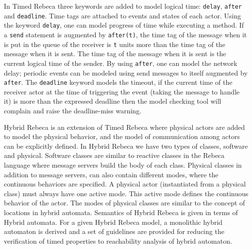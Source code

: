 \documentclass[
graybox,
envcountchap
]{svmult}
\begin{document}
\begin{bibunit}
In Timed Rebeca \cite{DBLP:journals/scp/KhamespanahSSKI15,DBLP:conf/birthday/SirjaniK16} three keywords are added to model logical time: \texttt{delay}, \texttt{after} and \texttt{deadline}. Time tags are attached to events and states of each actor. Using the keyword \texttt{delay}, one can model progress of time while executing a method. If a \texttt{send} statement is augmented by \texttt{after(t)},  the time tag  of the message when it is put in the queue of the receiver is \texttt{t} units more than the time tag of the message when it is sent. The time tag of the message when it is sent is the current logical time of the sender. By using \texttt{after}, one can model the network delay; periodic events can be modeled using send messages to itself augmented by  \texttt{after}.
The \texttt{deadline} keyword models the timeout, if the current time of the receiver actor at the time of triggering the event (taking the message to handle it) is more than the expressed deadline then the model checking tool will complain and raise the deadline-miss warning.

Hybrid Rebeca is an extension of Timed Rebeca where  physical actors are added to model the physical behavior, and the model of communication among actors can be explicitly defined. %
 In Hybrid Rebeca \cite{DBLP:conf/cyphy/JahandidehGS18} we have two types of classes, software and physical. Software classes are similar to reactive classes in the Rebeca language where message servers build the body of each class. Physical classes in addition to message servers, can also contain different modes, where the continuous behaviors are specified. A physical actor (instantiated from a physical class) must always have one active mode. This active mode defines the  continuous behavior of the actor. The modes of physical classes are similar to the concept of locations in hybrid automata. 
Semantics of Hybrid Rebeca is given in terms of Hybrid automata. For a given Hybrid Rebeca model, a monolithic  hybrid automaton is derived and a set of guidelines are provided for  reducing the verification of timed properties to reachability analysis of hybrid automaton. 
%



\end{bibunit}
\end{document}
